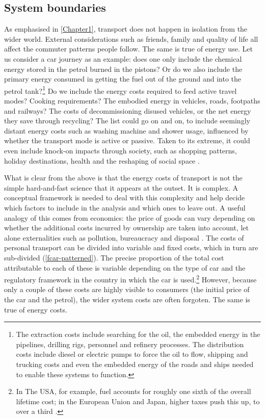 \subsection{System boundaries} 
As emphasised in \cref{Chapter1}, transport does not happen in isolation from
the wider world. External considerations such as friends, family and quality of
life all affect the commuter patterns people follow. The same is true of
energy use. Let us consider a car journey as an example: does one only include the
chemical energy stored in the petrol burned in the pistons? Or do we also
include the primary energy consumed in getting the fuel out of the ground and
into the petrol tank?\footnote{The extraction costs include
searching for the oil, the embedded energy in the pipelines, drilling rigs,
personnel and refinery processes. The distribution costs include diesel or
electric pumps to force the oil to flow, shipping and trucking costs and even
the embedded energy of the roads and ships needed to enable these systems to
function.}
Do we include the energy costs required to feed active travel modes? Cooking
requirements? The embodied energy in vehicles, roads, footpaths and railways?
The costs of decommissioning disused vehicles, or the net energy they save
through recycling?
The list could go on and on, to include seemingly distant energy costs such as
washing machine and shower usage, influenced by whether the transport mode is
active or passive. Taken to its extreme, it could even include knock-on impacts
through society, such as shopping patterns, holiday destinations, health and
the reshaping of social space \citep{Illich1974}.

What is clear from the above is that the energy costs of transport is not the
simple hard-and-fast science that it appears at the outset. It is complex. A
conceptual framework is needed to deal with this complexity and help decide
which factors to include in the analysis and which ones to leave out.
A useful analogy of this comes from economics: the price of goods can
vary depending on whether the additional costs incurred by ownership
are taken into account, let alone externalities such as pollution,
bureaucracy and disposal \citep{Perman2003}.
The costs of personal transport can be divided into variable and
fixed costs, which in turn are sub-divided (\cref{fcar-patterned}).
The precise proportion of the total cost attributable to each of these
is variable depending on the type of car and the regulatory framework
in the country in which the car is
used.\footnote{In The USA, for example,
fuel accounts for roughly one sixth of the overall lifetime cost;
in the European Union and Japan, higher taxes push this up, to over a
third \citep{Smil1993}.
}
However, because only a couple of these costs are highly
visible to consumers
(the initial price of the car and the petrol), the wider system costs are often
forgoten. The same is true of energy costs. 

